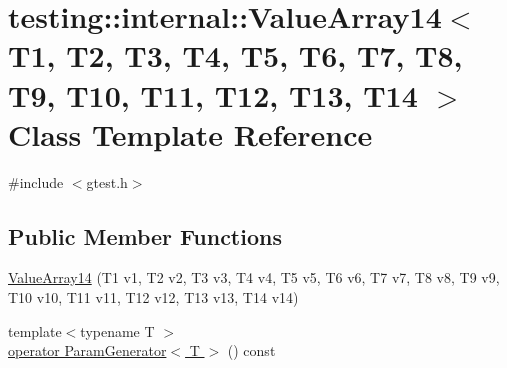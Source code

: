 \hypertarget{classtesting_1_1internal_1_1_value_array14}{\section{testing\-:\-:internal\-:\-:Value\-Array14$<$ T1, T2, T3, T4, T5, T6, T7, T8, T9, T10, T11, T12, T13, T14 $>$ Class Template Reference}
\label{classtesting_1_1internal_1_1_value_array14}
}


{\ttfamily \#include $<$gtest.\-h$>$}

\subsection*{Public Member Functions}
\begin{DoxyCompactItemize}
\item 
\hyperlink{classtesting_1_1internal_1_1_value_array14_a07a09d64aba1260d403adc661546ce48}{Value\-Array14} (T1 v1, T2 v2, T3 v3, T4 v4, T5 v5, T6 v6, T7 v7, T8 v8, T9 v9, T10 v10, T11 v11, T12 v12, T13 v13, T14 v14)
\item 
{\footnotesize template$<$typename T $>$ }\\\hyperlink{classtesting_1_1internal_1_1_value_array14_aab691578f146d26b5bfb5715ab6d1986}{operator Param\-Generator$<$ T $>$} () const 
\end{DoxyCompactItemize}


